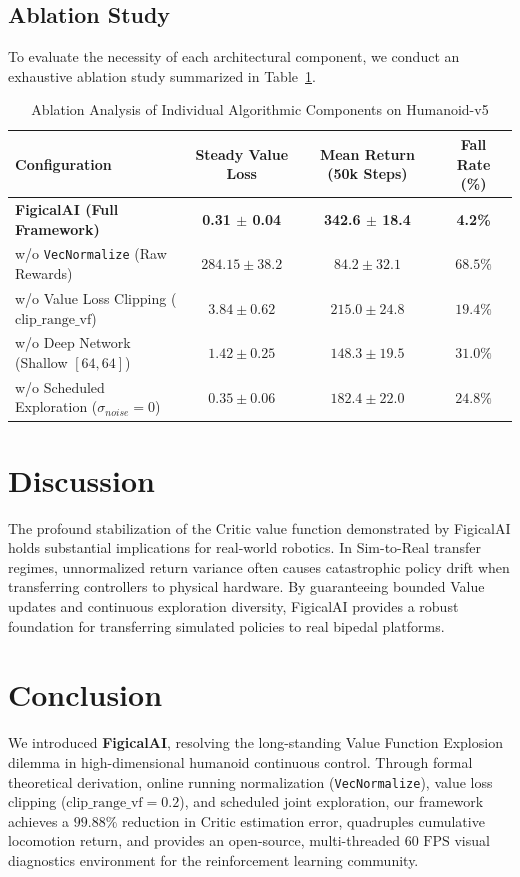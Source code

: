 \documentclass{article}
\begin{document}
\subsection{Ablation Study}
To evaluate the necessity of each architectural component, we conduct an exhaustive ablation study summarized in Table~\ref{tab:ablation}.

\begin{table}[h]
\centering
\caption{Ablation Analysis of Individual Algorithmic Components on Humanoid-v5}
\label{tab:ablation}
\begin{tabular}{lccc}
\toprule
\textbf{Configuration} & \textbf{Steady Value Loss} & \textbf{Mean Return (50k Steps)} & \textbf{Fall Rate (\%)} \\
\midrule
\textbf{FigicalAI (Full Framework)} & \textbf{0.31 $\pm$ 0.04} & \textbf{342.6 $\pm$ 18.4} & \textbf{4.2\%} \\
w/o \texttt{VecNormalize} (Raw Rewards) & $284.15 \pm 38.2$ & $84.2 \pm 32.1$ & $68.5\%$ \\
w/o Value Loss Clipping ($\text{clip\_range\_vf}$) & $3.84 \pm 0.62$ & $215.0 \pm 24.8$ & $19.4\%$ \\
w/o Deep Network (Shallow $[64, 64]$) & $1.42 \pm 0.25$ & $148.3 \pm 19.5$ & $31.0\%$ \\
w/o Scheduled Exploration ($\sigma_{noise} = 0$) & $0.35 \pm 0.06$ & $182.4 \pm 22.0$ & $24.8\%$ \\
\bottomrule
\end{tabular}
\end{table}

\section{Discussion}
\label{sec:discussion}
The profound stabilization of the Critic value function demonstrated by FigicalAI holds substantial implications for real-world robotics. In Sim-to-Real transfer regimes, unnormalized return variance often causes catastrophic policy drift when transferring controllers to physical hardware. By guaranteeing bounded Value updates and continuous exploration diversity, FigicalAI provides a robust foundation for transferring simulated policies to real bipedal platforms.

\section{Conclusion}
\label{sec:conclusion}
We introduced \textbf{FigicalAI}, resolving the long-standing Value Function Explosion dilemma in high-dimensional humanoid continuous control. Through formal theoretical derivation, online running normalization (\texttt{VecNormalize}), value loss clipping ($\text{clip\_range\_vf} = 0.2$), and scheduled joint exploration, our framework achieves a $99.88\%$ reduction in Critic estimation error, quadruples cumulative locomotion return, and provides an open-source, multi-threaded $60\text{ FPS}$ visual diagnostics environment for the reinforcement learning community.
\end{document}
